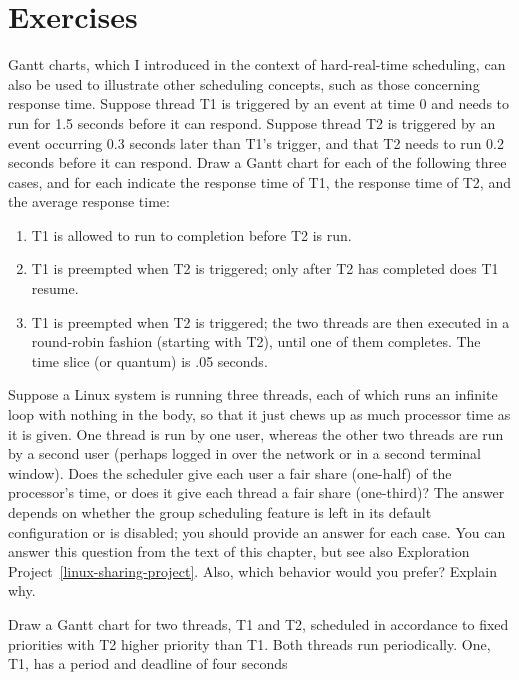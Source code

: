 \section*{Exercises}
\begin{chapterEnumerate}
\item
Gantt charts, which I introduced in the context of hard-real-time
scheduling, can also be used to illustrate other scheduling concepts,
such as those concerning response time.  Suppose thread T1 is
triggered by an event at time 0 and needs to run for 1.5 seconds
before it can respond.  Suppose thread T2 is triggered by an event
occurring 0.3 seconds later than T1's trigger, and that T2 needs to run
0.2 seconds before it can respond.  Draw a Gantt chart for each of the
following three cases, and for each indicate the response time of T1,
the response time of T2, and the average response time:
\begin{enumerate}
\item
T1 is allowed to run to completion before T2 is run.
\item
T1 is preempted when T2 is triggered; only after T2 has completed does
T1 resume.
\item
T1 is preempted when T2 is triggered; the two threads are then
executed in a round-robin fashion (starting with T2), until one
of them completes.  The time slice (or quantum) is .05 seconds.
\end{enumerate}
\item\label{linux-sharing-exercise}
Suppose a Linux system is running three threads, each of which runs an
infinite loop with nothing in the body, so that it just chews up as
much processor time as it is given.  One thread is run by one user,
whereas the other two threads are run by a second user (perhaps logged
in over the network or in a second terminal window).  Does the
scheduler give each user a fair share (one-half) of the
processor's time, or does it give each thread a fair share (one-third)?
The answer depends on whether the group scheduling feature is
left in its default configuration or is disabled; you should
provide an answer for each case.
You can answer this question from the text of this chapter, but see
also Exploration Project~\ref{linux-sharing-project}.
Also, which behavior would you prefer?  Explain why.
\item\label{Gantt-backward-RMS-exercise}
Draw a Gantt chart for two threads, T1 and T2, scheduled in accordance
to fixed priorities with T2 higher priority than T1.  Both threads run
periodically.  One, T1, has a period and deadline of four seconds

\end{chapterEnumerate}
